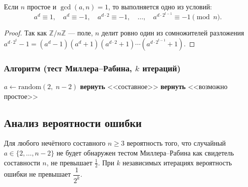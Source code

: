\begin{Statement}{}{}
	Если $n$ простое и $\gcd(a,n)=1$, то выполняется одно из условий:
	\[
	a^d \equiv 1, \quad
	a^d \equiv -1, \quad
	a^{d\cdot 2} \equiv -1, \quad
	\ldots, \quad
	a^{d\cdot 2^{t-1}} \equiv -1 \pmod{n}.
	\]
\end{Statement}

\begin{proof}
	Так как $\mathbb{Z}/n\mathbb{Z}$ --- поле, $n$ делит ровно один из сомножителей разложения $a^{d\cdot 2^t}-1 = (a^d-1)(a^d+1)(a^{d\cdot 2}+1)\cdots(a^{d\cdot 2^{t-1}}+1)$.
\end{proof}

\subsubsection*{Алгоритм (тест Миллера--Рабина, $k$ итераций)}

\begin{algorithmic}
	\State $a \gets \mathrm{random}(2,\; n-2)$
	\State \textbf{вернуть} <<составное>>
	\EndIf
	\EndFor
	\State \textbf{вернуть} <<возможно простое>>
\end{algorithmic}

\subsection{Анализ вероятности ошибки}

\begin{Theorem}{}{}
	Для любого нечётного составного $n \geq 3$ вероятность того, что случайный $a \in \{2,\ldots,n-2\}$ не будет обнаружен тестом Миллера--Рабина как свидетель составности $n$, не превышает $\tfrac{1}{2}$. При $k$ независимых итерациях вероятность ошибки не превышает $\dfrac{1}{2^k}$.
\end{Theorem}

